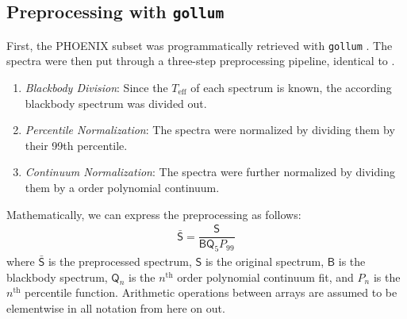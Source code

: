 \documentclass[twocolumn]{aastex631}
\begin{document}
\subsection{Preprocessing with \texttt{gollum}}
First, the PHOENIX subset was programmatically retrieved with \texttt{gollum} \citep{gollum}. The spectra were then put through a 
three-step preprocessing pipeline, identical to .
\begin{enumerate}
    \item \textit{Blackbody Division}: Since the $T_{\mathrm{eff}}$ of each spectrum 
    is known, the according blackbody spectrum was divided out.
    \item \textit{Percentile Normalization}: The spectra were normalized by dividing
    them by their 99th percentile.
    \item \textit{Continuum Normalization}: The spectra were further normalized by 
    dividing them by a  order polynomial continuum.
\end{enumerate}
Mathematically, we can express the preprocessing as follows:
\begin{gather}
    \mathsf{\bar{S}} = \dfrac{\mathsf{S}}{\mathsf{B}\mathsf{Q}_5P_{99}}
\end{gather}
where $\mathsf{\bar{S}}$ is the preprocessed spectrum, $\mathsf{S}$ is the 
original spectrum,  $\mathsf{B}$ is the blackbody spectrum, $\mathsf{Q}_n$ 
is the $n^\mathrm{th}$ order polynomial continuum fit, and $P_n$ is the 
$n^\mathrm{th}$ percentile function. Arithmetic operations between arrays 
are assumed to be elementwise in all notation from here on out.
\end{document}
